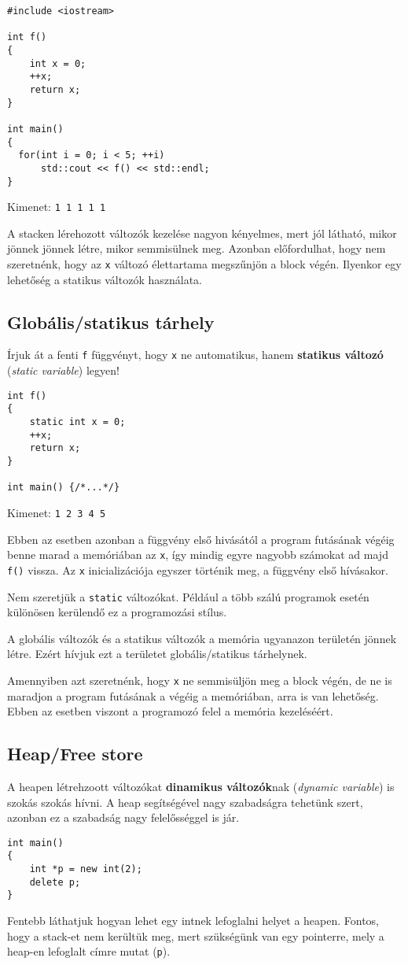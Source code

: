 \documentclass[../cpp_book/cpp_book.tex]{subfiles}
\begin{document}
	\begin{lstlisting}
#include <iostream>

int f()
{
	int x = 0;
	++x;
	return x;
}

int main()
{
  for(int i = 0; i < 5; ++i)
	  std::cout << f() << std::endl;
}
	\end{lstlisting}
	Kimenet: \texttt{1 1 1 1 1}
	\smallskip
	
  A stacken lérehozott változók kezelése nagyon kényelmes, mert jól látható, mikor jönnek jönnek létre, mikor semmisülnek meg. Azonban előfordulhat, hogy nem szeretnénk, hogy az \texttt{x} változó élettartama megszűnjön a block végén. Ilyenkor egy lehetőség a statikus változók használata.
	\subsection{Globális/statikus tárhely}
	Írjuk át a fenti \texttt{f} függvényt, hogy \texttt{x} ne automatikus, hanem \textbf{statikus változó} (\textit{static variable}) legyen!
	\begin{lstlisting}
int f()
{
	static int x = 0;
	++x;
	return x;
}

int main() {/*...*/}
	\end{lstlisting}
	Kimenet: \texttt{1 2 3 4 5}
	
  Ebben az esetben azonban a függvény első hivásától a program futásának végéig benne marad a memóriában az \texttt{x}, így mindig egyre nagyobb számokat ad majd \texttt{f()} vissza. Az \texttt{x} inicializációja egyszer történik meg, a függvény első hívásakor. 
	\begin{note}
		Nem szeretjük a \texttt{static} változókat. Például a több szálú programok esetén különösen kerülendő ez a programozási stílus.
	\end{note}

  A globális változók és a statikus változók a memória ugyanazon területén jönnek létre. Ezért hívjuk ezt a területet globális/statikus tárhelynek.

  \medskip
	Amennyiben azt szeretnénk, hogy \texttt{x} ne semmisüljön meg a block végén, de ne is maradjon a program futásának a végéig a memóriában, arra is van lehetőség. Ebben az esetben viszont a programozó felel a memória kezeléséért.
	\subsection{Heap/Free store}
	A heapen létrehzoott változókat \textbf{dinamikus változók}nak (\textit{dynamic variable}) is szokás szokás hívni. A heap segítségével nagy szabadságra tehetünk szert, azonban ez a szabadság nagy felelősséggel is jár.
	\begin{lstlisting}
int main()
{
	int *p = new int(2);
	delete p;
}
	\end{lstlisting}
	Fentebb láthatjuk hogyan lehet egy intnek lefoglalni helyet a heapen. Fontos, hogy a stack-et nem kerültük meg, mert szükségünk van egy pointerre, mely a heap-en lefoglalt címre mutat (\texttt{p}).
	
\end{document}
